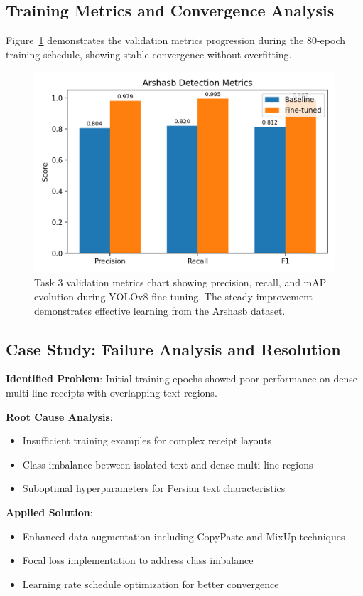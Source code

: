 \documentclass[11pt,a4paper]{article}
\begin{document}
\subsection{Training Metrics and Convergence Analysis}
Figure~\ref{fig:task3-metrics} demonstrates the validation metrics progression during the 80-epoch training schedule, showing stable convergence without overfitting.

\begin{figure}[h]
  \centering
  \includegraphics[width=0.8\linewidth]{figures/val_metrics_comparison.png}
  \caption{Task 3 validation metrics chart showing precision, recall, and mAP evolution during YOLOv8 fine-tuning. The steady improvement demonstrates effective learning from the Arshasb dataset.}
  \label{fig:task3-metrics}
\end{figure}

\subsection{Case Study: Failure Analysis and Resolution}
\textbf{Identified Problem}: Initial training epochs showed poor performance on dense multi-line receipts with overlapping text regions.

\textbf{Root Cause Analysis}:
\begin{itemize}
  \item Insufficient training examples for complex receipt layouts
  \item Class imbalance between isolated text and dense multi-line regions
  \item Suboptimal hyperparameters for Persian text characteristics
\end{itemize}

\textbf{Applied Solution}:
\begin{itemize}
  \item Enhanced data augmentation including CopyPaste and MixUp techniques
  \item Focal loss implementation to address class imbalance
  \item Learning rate schedule optimization for better convergence
\end{itemize}
\end{document}
